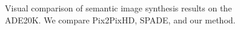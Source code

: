 \begin{figure}[]
\begin{tabular} {cc|cc|c}





\end{tabular}
\vspace{-2mm}
	\caption{Visual  comparison  of  semantic  image  synthesis  results  on  the ADE20K. We compare Pix2PixHD, SPADE, and our method.}
	\label{fig:ADE20K results}	
\vspace{-3mm}	
 \end{figure}
 \egroup
 \addtolength{\tabcolsep}{4.5pt}